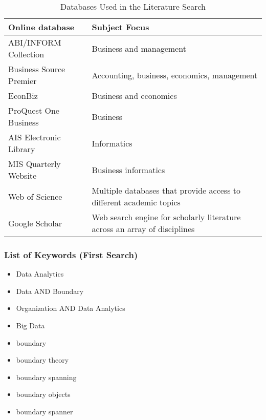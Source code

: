 
\begin{table}[htbp]
    \centering
    \small
    \begin{tabular}{lL{8cm}}
    \hline
    Online database           & Subject Focus                                                          \\ \hline
    ABI/INFORM Collection     & Business and management                                                \\
    Business Source Premier   & Accounting, business, economics, management                            \\
    EconBiz                   & Business and economics                                                 \\
    ProQuest One Business     & Business                                                               \\
    AIS Electronic Library    & Informatics                                                            \\
    MIS Quarterly Website     & Business informatics                                                   \\
    Web of Science            & Multiple databases that provide access to different academic topics    \\
    Google Scholar            & Web search engine for scholarly literature across an array of disciplines \\ \hline
    \end{tabular}
    \caption{Databases Used in the Literature Search}
    \label{literature_search_db}
    \end{table}
    
\subsubsection*{List of Keywords (First Search)}

\begin{itemize}
    \item Data Analytics
	\item Data AND Boundary
	\item Organization AND Data Analytics
	\item Big Data
	\item boundary 
	\item boundary theory
	\item boundary spanning
	\item boundary objects
    \item boundary spanner
\end{itemize}

